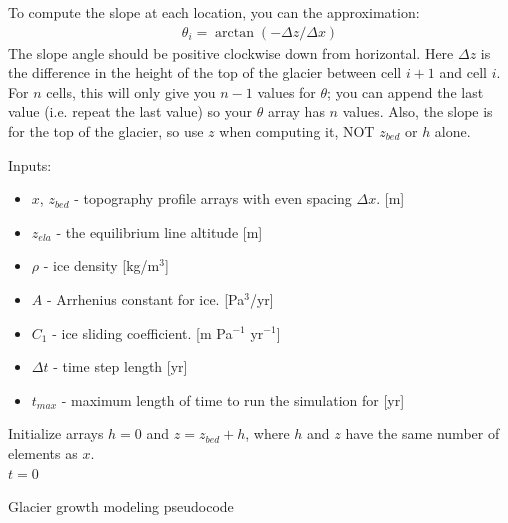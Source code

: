 \documentclass[11pt, oneside]{article}   	%
\begin{document}
To compute the slope at each location, you can the approximation:
\begin{eqnarray}
\theta_i = \arctan(-\Delta z /\Delta x)
\end{eqnarray}
 The slope angle should be positive clockwise down from horizontal. Here $\Delta z$ is the difference in the height of the top of the glacier between cell $i+1$ and cell $i$. For $n$ cells, this will only give you $n-1$ values for $\theta$; you can append the last value (i.e. repeat the last value) so your $\theta$ array has $n$ values.  Also, the slope is for the top of the glacier, so use $z$ when computing it, NOT $z_{bed}$ or $h$ alone.

\begin{algorithm}[H]
\label{pseudocode} %
	Inputs:
 \begin{itemize}
\item $x$, $z_{bed}$ - topography profile arrays  with even spacing $\Delta x$. [m]
\item $z_{ela}$   - the equilibrium line altitude [m]
\item $\rho$  - ice density [kg/m$^3$]
\item $A$ - Arrhenius constant for ice. [Pa$^3$/yr]
\item $C_1$ - ice sliding coefficient. [m Pa$^{-1}$ yr$^{-1}$]
\item $\Delta t$ - time step length [yr]
\item  $t_{max}$ - maximum length of time to run the simulation for [yr]	
\end{itemize}
Initialize arrays $h = 0$  and $z = z_{bed} + h$, where $h$ and $z$ have the same number of elements as $x$.\\
 $t = 0$ \\
 \caption{Glacier growth modeling pseudocode}
\end{algorithm}
\end{document}
